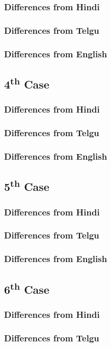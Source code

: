 \documentclass[a4paper,10pt]{article}
\begin{document}
\subsubsection{Differences from Hindi}
\subsubsection{Differences from Telgu}
\subsubsection{Differences from English}
\subsection{4\textsuperscript{th} Case}
\subsubsection{Differences from Hindi}
\subsubsection{Differences from Telgu}
\subsubsection{Differences from English}
\subsection{5\textsuperscript{th} Case}
\subsubsection{Differences from Hindi}
\subsubsection{Differences from Telgu}
\subsubsection{Differences from English}
\subsection{6\textsuperscript{th} Case}
\subsubsection{Differences from Hindi}
\subsubsection{Differences from Telgu}
\end{document}
